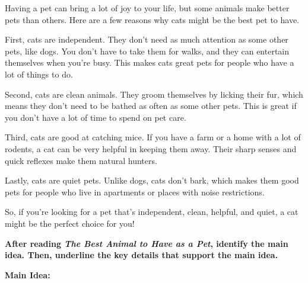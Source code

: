 \documentclass[12pt]{article}
\begin{document}
\begin{tcolorbox}[colframe=black!60, colback=white, 
coltitle=black, colbacktitle=black!15, fonttitle=\bfseries\Large, 
title=Text: The Best Animal to Have as a Pet, halign title=center, left=10pt, right=10pt, top=10pt, bottom=15pt]
Having a pet can bring a lot of joy to your life, but some animals make better pets than others. Here are a few reasons why cats might be the best pet to have.

First, cats are independent. They don’t need as much attention as some other pets, like dogs. You don’t have to take them for walks, and they can entertain themselves when you’re busy. This makes cats great pets for people who have a lot of things to do.

Second, cats are clean animals. They groom themselves by licking their fur, which means they don’t need to be bathed as often as some other pets. This is great if you don’t have a lot of time to spend on pet care.

Third, cats are good at catching mice. If you have a farm or a home with a lot of rodents, a cat can be very helpful in keeping them away. Their sharp senses and quick reflexes make them natural hunters.

Lastly, cats are quiet pets. Unlike dogs, cats don’t bark, which makes them good pets for people who live in apartments or places with noise restrictions.

So, if you’re looking for a pet that’s independent, clean, helpful, and quiet, a cat might be the perfect choice for you!



     \end{tcolorbox}
\begin{tcolorbox}[colframe=black!60, colback=white, 
coltitle=black, colbacktitle=black!15, fonttitle=\bfseries\Large, 
title=Independent Practice, halign title=center, left=10pt, right=10pt, top=10pt, bottom=15pt]

\textbf{After reading \textit{The Best Animal to Have as a Pet}, identify the main idea. Then, underline the key details that support the main idea.}



\vspace{2cm}
\textbf{Main Idea:} \underline{\hspace{12.5cm}} 
\vspace{1cm} \\


\end{tcolorbox}
\end{document}
